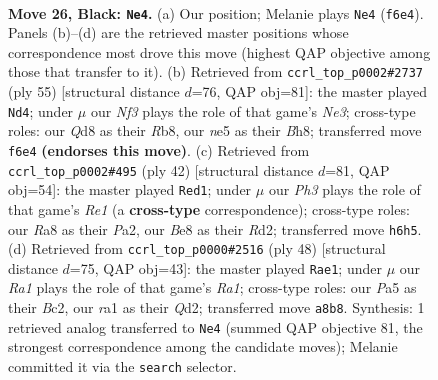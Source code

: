 \documentclass[11pt]{article}
\begin{document}
\clearpage

\begin{figure}[p]\centering
\begin{subfigure}{0.46\textwidth}\centering
\resizebox{\linewidth}{!}{%
\newchessgame
\chessboard[
  setfen={r2qb1k1/p4pp1/5n1p/p2pN1P1/1r5P/1P1B4/PQ3P2/R3R1K1 b - - 0 26},
  showmover=false,
  pgfstyle=straightmove, color=movearrow, markmove={f6-e4}
]}
\caption{}
\end{subfigure}\hfill
\begin{subfigure}{0.46\textwidth}\centering
\resizebox{\linewidth}{!}{%
\newchessgame
\chessboard[
  setfen={1r2r1kb/p2q1p1p/3Pn1pB/2p1pP2/p3N3/7P/1P1Q2P1/4RR1K b - - 0 28},
  showmover=false,
  pgfstyle=straightmove, color=movearrow, markmove={e6-d4}
]}
\caption{}
\end{subfigure}
\\[4pt]
\begin{subfigure}{0.46\textwidth}\centering
\resizebox{\linewidth}{!}{%
\newchessgame
\chessboard[
  setfen={2r1r1k1/p2nq2p/1p4p1/4pp2/1PP1b3/2Q2NP1/P2R1PBP/4R1K1 w - - 1 22},
  showmover=false,
  pgfstyle=straightmove, color=movearrow, markmove={e1-d1}
]}
\caption{}
\end{subfigure}\hfill
\begin{subfigure}{0.46\textwidth}\centering
\resizebox{\linewidth}{!}{%
\newchessgame
\chessboard[
  setfen={r2r3k/1p1bq1p1/2n4p/p2p4/P2Np3/2P1R2P/1PBQ1PP1/R5K1 w - - 6 25},
  showmover=false,
  pgfstyle=straightmove, color=movearrow, markmove={a1-e1}
]}
\caption{}
\end{subfigure}
\caption{\textbf{Move 26, Black: \texttt{Ne4}.} (a) Our position; Melanie plays \texttt{Ne4} (\texttt{f6e4}). Panels (b)--(d) are the retrieved master positions whose correspondence most drove this move (highest QAP objective among those that transfer to it). (b) Retrieved from \texttt{ccrl\_top\_p0002\#2737} (ply 55) [structural distance $d$=76, QAP obj=81]: the master played \texttt{Nd4}; under $\mu$ our \emph{Nf3} plays the role of that game's \emph{Ne3}; cross-type roles: our \emph{Q}d8 as their \emph{R}b8, our \emph{n}e5 as their \emph{B}h8; transferred move \texttt{f6e4} \textbf{(endorses this move)}. (c) Retrieved from \texttt{ccrl\_top\_p0002\#495} (ply 42) [structural distance $d$=81, QAP obj=54]: the master played \texttt{Red1}; under $\mu$ our \emph{Ph3} plays the role of that game's \emph{Re1} (a \textbf{cross-type} correspondence); cross-type roles: our \emph{R}a8 as their \emph{P}a2, our \emph{B}e8 as their \emph{R}d2; transferred move \texttt{h6h5}. (d) Retrieved from \texttt{ccrl\_top\_p0000\#2516} (ply 48) [structural distance $d$=75, QAP obj=43]: the master played \texttt{Rae1}; under $\mu$ our \emph{Ra1} plays the role of that game's \emph{Ra1}; cross-type roles: our \emph{P}a5 as their \emph{B}c2, our \emph{r}a1 as their \emph{Q}d2; transferred move \texttt{a8b8}. Synthesis: 1 retrieved analog transferred to \texttt{Ne4} (summed QAP objective 81, the strongest correspondence among the candidate moves); Melanie committed it via the \texttt{search} selector.}
\label{fig:thought-m51}
\end{figure}
\end{document}
